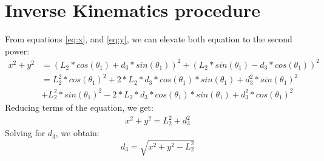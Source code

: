\documentclass[12pt]{article}
\begin{document}

    \label{sec:matlabcode}
    \section{Inverse Kinematics procedure}
    From equations \ref{eq:x}, and \ref{eq:y}, we can elevate both equation to the second power:
    \begin{equation}
        \begin{split}
        x^2 + y^2 & = (L_2 * cos(\theta_1) + d_3 * sin(\theta_1))^2 + (L_2 * sin(\theta_1) - d_3 * cos(\theta_1))^2 \nonumber \nonumber \\
	     & = L_2^2 * cos(\theta_1)^2 + 2*L_2*d_3*cos(\theta_1)*sin(\theta_1) + d_3^2 * sin(\theta_1)^2 \nonumber \\
        & + L_2^2 * sin(\theta_1)^2 - 2*L_2*d_3*cos(\theta_1)*sin(\theta_1) + d_3^2 * cos(\theta_1)^2 \nonumber
        \end{split}
    \end{equation}
    Reducing terms of the equation, we get:
    \begin{equation} 
        \begin{split}
	        x^2 + y^2 = L_2^2 + d_3^2 \nonumber
        \end{split}
    \end{equation}
    Solving for $d_3$, we obtain:
    \begin{equation}
        d_3 = \sqrt{x^2 + y^2 - L_2^2}
    \end{equation}
    
\end{document}
